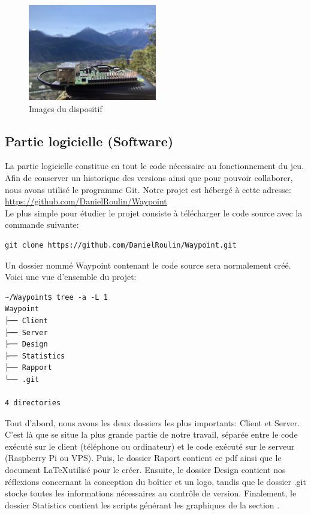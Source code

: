 \documentclass[a4paper]{article}
\begin{document}
\begin{figure}
    \includegraphics[width=0.5\textwidth]{images/hardware/Raspberry4.jpg}
    \caption{Images du dispositif}
    \label{fig:images_raspberry}
\end{figure}

\subsection{Partie logicielle (Software)}

La partie logicielle constitue en tout le code nécessaire au fonctionnement du jeu. Afin de conserver un historique des versions ainsi que pour pouvoir collaborer, nous avons utilisé le programme Git\cite{git}.
Notre projet est hébergé à cette adresse: \url{https://github.com/DanielRoulin/Waypoint} \\
Le plus simple pour étudier le projet consiste à télécharger le code source avec la commande suivante:
\begin{verbatim}
git clone https://github.com/DanielRoulin/Waypoint.git
\end{verbatim}
Un dossier nommé Waypoint contenant le code source sera normalement créé. \\
Voici une vue d’ensemble du projet:
\begin{verbatim}
~/Waypoint$ tree -a -L 1
Waypoint
├── Client
├── Server
├── Design
├── Statistics
├── Rapport
└── .git
 
4 directories
\end{verbatim}

Tout d’abord, nous avons les deux dossiers les plus importants: Client et  Server. C’est là que se situe la plus grande partie de notre travail, séparée entre le code exécuté sur le client (téléphone ou ordinateur) et le code exécuté sur le serveur (Raspberry Pi ou VPS\cite{vps}). Puis, le dossier Raport contient ce pdf ainsi que le document \LaTeX  utilisé pour le créer. Ensuite, le dossier Design contient nos réflexions concernant la conception du boîtier et un logo, tandis que le dossier .git stocke toutes les informations nécessaires au contrôle de version. Finalement, le dossier Statistics contient les scripts générant les graphiques de la section .
\end{document}

